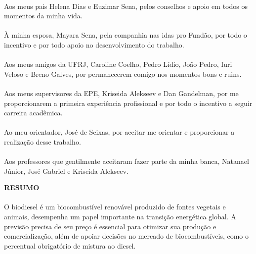 \paragraph{}Aos meus pais Helena Dias e Euzimar Sena, pelos conselhos e apoio em todos os momentos da minha vida.

\paragraph{}À minha esposa, Mayara Sena, pela companhia nas idas pro Fundão, por todo o incentivo e por todo apoio no desenvolvimento do trabalho.

\paragraph{}Aos meus amigos da UFRJ, Caroline Coelho, Pedro Lídio, João Pedro, Iuri Veloso e Breno Galves, por permanecerem comigo nos momentos bons e ruins.

\paragraph{}Aos meus supervisores da EPE, Kriseida Alekseev e Dan Gandelman, por me proporcionarem a primeira experiência profissional e por todo o incentivo a seguir carreira acadêmica.

\paragraph{}Ao meu orientador, José de Seixas, por aceitar me orientar e proporcionar a realização desse trabalho.

\paragraph{}Aos professores que gentilmente aceitaram fazer parte da minha banca, Natanael Júnior, José Gabriel e Kriseida Alekseev.

\pagebreak


\begin{center}
	\textbf{RESUMO}
\end{center}
\vspace{0.5cm}

\paragraph{} O biodiesel é um biocombustível renovável produzido de fontes vegetais e animais, desempenha um papel importante na transição energética global. A previsão precisa de seu preço é essencial para otimizar sua produção e comercialização, além de apoiar decisões no mercado de biocombustíveis, como o percentual obrigatório de mistura ao diesel.


